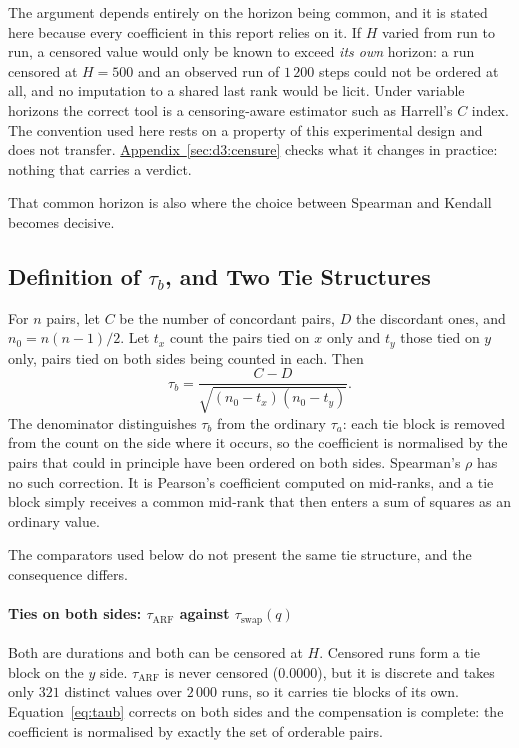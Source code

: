 \documentclass[10pt,conference]{IEEEtran}
\theoremstyle{definition}
\begin{document}
The argument depends entirely on the horizon being common, and it is stated here because
every coefficient in this report relies on it. If $H$ varied from run to run, a censored
value would only be known to exceed \emph{its own} horizon: a run censored at $H = 500$
and an observed run of $1\,200$ steps could not be ordered at all, and no imputation to a
shared last rank would be licit. Under variable horizons the correct tool is a
censoring-aware estimator such as Harrell's $C$ index. The convention used here rests on a
property of this experimental design and does not transfer. \hyperref[sec:d3:censure]{Appendix~\ref*{sec:d3:censure}}
checks what it changes in practice: nothing that carries a verdict.

That common horizon is also where the choice between Spearman and Kendall becomes
decisive.

\subsection{Definition of $\tau_b$, and Two Tie Structures}

For $n$ pairs, let $C$ be the number of concordant pairs, $D$ the discordant ones, and
$n_0 = n(n-1)/2$. Let $t_x$ count the pairs tied on $x$ only and $t_y$ those tied on $y$
only, pairs tied on both sides being counted in each. Then
\begin{equation}
  \tau_b = \frac{C - D}{\sqrt{(n_0 - t_x)(n_0 - t_y)}}.
  \label{eq:taub}
\end{equation}
The denominator distinguishes $\tau_b$ from the ordinary $\tau_a$: each tie block is
removed from the count on the side where it occurs, so the coefficient is normalised by
the pairs that could in principle have been ordered on both sides. Spearman's $\rho$ has
no such correction. It is Pearson's coefficient computed on mid-ranks, and a tie block
simply receives a common mid-rank that then enters a sum of squares as an ordinary value.

The comparators used below do not present the same tie structure, and the consequence
differs.

\paragraph{Ties on both sides: $\tau_{\mathrm{ARF}}$ against $\tau_{\mathrm{swap}}(q)$}
Both are durations and both can be censored at $H$. Censored runs form a tie block on the
$y$ side. $\tau_{\mathrm{ARF}}$ is never censored ($0.0000$), but it is discrete and takes
only $321$ distinct values over $2\,000$ runs, so it carries tie blocks of its own.
Equation~\eqref{eq:taub} corrects on both sides and the compensation is complete: the
coefficient is normalised by exactly the set of orderable pairs.
\end{document}
